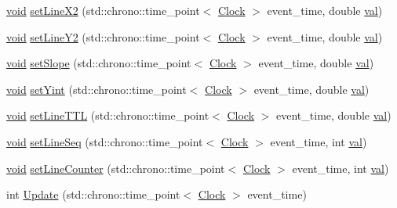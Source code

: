 \begin{DoxyCompactItemize}
\item 
\mbox{\hyperlink{glad_8h_a950fc91edb4504f62f1c577bf4727c29}{void}} \mbox{\hyperlink{class_line_ade959bc4d4f69bb421ed4f69c0d77fb7}{set\+Line\+X2}} (std\+::chrono\+::time\+\_\+point$<$ \mbox{\hyperlink{universe_8h_a0ef8d951d1ca5ab3cfaf7ab4c7a6fd80}{Clock}} $>$ event\+\_\+time, double \mbox{\hyperlink{glad_8h_a26942fd2ed566ef553eae82d2c109c8f}{val}})
\item 
\mbox{\hyperlink{glad_8h_a950fc91edb4504f62f1c577bf4727c29}{void}} \mbox{\hyperlink{class_line_a671f64c437fe1bef798476d93c675099}{set\+Line\+Y2}} (std\+::chrono\+::time\+\_\+point$<$ \mbox{\hyperlink{universe_8h_a0ef8d951d1ca5ab3cfaf7ab4c7a6fd80}{Clock}} $>$ event\+\_\+time, double \mbox{\hyperlink{glad_8h_a26942fd2ed566ef553eae82d2c109c8f}{val}})
\item 
\mbox{\hyperlink{glad_8h_a950fc91edb4504f62f1c577bf4727c29}{void}} \mbox{\hyperlink{class_line_a3fb9e9eab13d146feff0bc891709eaf9}{set\+Slope}} (std\+::chrono\+::time\+\_\+point$<$ \mbox{\hyperlink{universe_8h_a0ef8d951d1ca5ab3cfaf7ab4c7a6fd80}{Clock}} $>$ event\+\_\+time, double \mbox{\hyperlink{glad_8h_a26942fd2ed566ef553eae82d2c109c8f}{val}})
\item 
\mbox{\hyperlink{glad_8h_a950fc91edb4504f62f1c577bf4727c29}{void}} \mbox{\hyperlink{class_line_ad966eb3f1bd4cb29976b3e97811c344f}{set\+Yint}} (std\+::chrono\+::time\+\_\+point$<$ \mbox{\hyperlink{universe_8h_a0ef8d951d1ca5ab3cfaf7ab4c7a6fd80}{Clock}} $>$ event\+\_\+time, double \mbox{\hyperlink{glad_8h_a26942fd2ed566ef553eae82d2c109c8f}{val}})
\item 
\mbox{\hyperlink{glad_8h_a950fc91edb4504f62f1c577bf4727c29}{void}} \mbox{\hyperlink{class_line_a602398c8c3131ec7236ccadbab8281d5}{set\+Line\+T\+TL}} (std\+::chrono\+::time\+\_\+point$<$ \mbox{\hyperlink{universe_8h_a0ef8d951d1ca5ab3cfaf7ab4c7a6fd80}{Clock}} $>$ event\+\_\+time, double \mbox{\hyperlink{glad_8h_a26942fd2ed566ef553eae82d2c109c8f}{val}})
\item 
\mbox{\hyperlink{glad_8h_a950fc91edb4504f62f1c577bf4727c29}{void}} \mbox{\hyperlink{class_line_a7c315c5ffdd4fa875918583738e2e157}{set\+Line\+Seq}} (std\+::chrono\+::time\+\_\+point$<$ \mbox{\hyperlink{universe_8h_a0ef8d951d1ca5ab3cfaf7ab4c7a6fd80}{Clock}} $>$ event\+\_\+time, int \mbox{\hyperlink{glad_8h_a26942fd2ed566ef553eae82d2c109c8f}{val}})
\item 
\mbox{\hyperlink{glad_8h_a950fc91edb4504f62f1c577bf4727c29}{void}} \mbox{\hyperlink{class_line_ab98abcf3c8546e266ae5bbea243d8b8d}{set\+Line\+Counter}} (std\+::chrono\+::time\+\_\+point$<$ \mbox{\hyperlink{universe_8h_a0ef8d951d1ca5ab3cfaf7ab4c7a6fd80}{Clock}} $>$ event\+\_\+time, int \mbox{\hyperlink{glad_8h_a26942fd2ed566ef553eae82d2c109c8f}{val}})
\item 
int \mbox{\hyperlink{class_line_a8c6dece66f5cd93ce40134002a40f505}{Update}} (std\+::chrono\+::time\+\_\+point$<$ \mbox{\hyperlink{universe_8h_a0ef8d951d1ca5ab3cfaf7ab4c7a6fd80}{Clock}} $>$ event\+\_\+time)
\end{DoxyCompactItemize}
